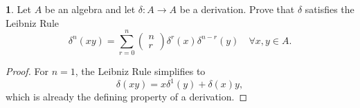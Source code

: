 \documentclass[12pt]{article}
\theoremstyle{definition}
\newtheorem{ex}{}
\begin{document}
\begin{ex}
	Let $A$ be an algebra and let $\delta : A \to A $ be a derivation.
	Prove that $\delta$ satisfies the Leibniz Rule \begin{equation*}
		\delta^n(xy) = \sum_{r=0}^n \begin{pmatrix}n\\r\end{pmatrix} \delta^r(x) \delta^{n-r}(y) \hspace{1em} \forall x, y \in A.
	\end{equation*}
\end{ex}
\begin{proof}
	For $n = 1$, the Leibniz Rule simplifies to \begin{equation*}
		\delta(xy) = x\delta^1(y) + \delta(x)y,
	\end{equation*}
	which is already the defining property of a derivation.


\end{proof}
\end{document}
